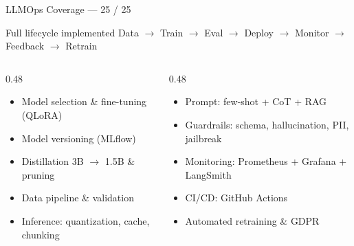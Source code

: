 \documentclass[aspectratio=169]{beamer}
\begin{document}
\begin{frame}{LLMOps Coverage --- 25 / 25}
  \begin{block}{Full lifecycle implemented}
    Data $\rightarrow$ Train $\rightarrow$ Eval $\rightarrow$ Deploy $\rightarrow$ Monitor $\rightarrow$ Feedback $\rightarrow$ Retrain
  \end{block}
  \vspace{0.4em}
  \begin{columns}[T,onlytextwidth]
    \begin{column}{0.48\textwidth}
      \begin{itemize}
        \item Model selection \& fine-tuning (QLoRA)
        \item Model versioning (MLflow)
        \item Distillation 3B $\rightarrow$ 1.5B \& pruning
        \item Data pipeline \& validation
        \item Inference: quantization, cache, chunking
      \end{itemize}
    \end{column}
    \begin{column}{0.48\textwidth}
      \begin{itemize}
        \item Prompt: few-shot + CoT + RAG
        \item Guardrails: schema, hallucination, PII, jailbreak
        \item Monitoring: Prometheus + Grafana + LangSmith
        \item CI/CD: GitHub Actions
        \item Automated retraining \& GDPR
      \end{itemize}
    \end{column}
  \end{columns}
\end{frame}
\end{document}
